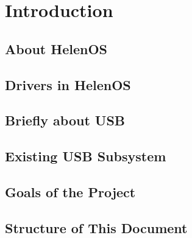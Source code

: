 \chapter{Introduction}

\section{About HelenOS}

\section{Drivers in HelenOS}

\section{Briefly about USB}


\section{Existing USB Subsystem}


\section{Goals of the Project}


\section{Structure of This Document}

